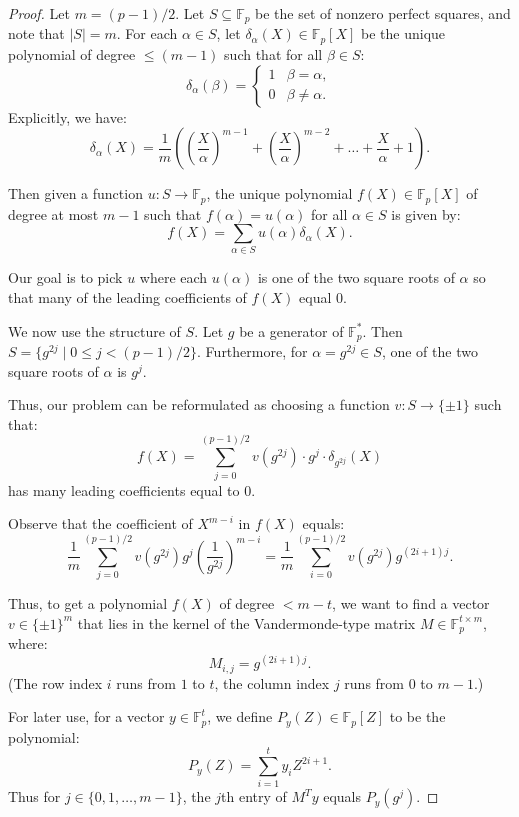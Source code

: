 \documentclass[10pt,a4paper]{article}
\newcommand{\F}{\mathbb{F}}
\begin{document}
\begin{proof}
Let $m = (p-1)/2$. Let $S \subseteq \F_p$ be the set of nonzero perfect squares,
and note that $|S| = m$.
For each $\alpha \in S$, let $\delta_\alpha(X) \in \F_p[X]$ be
the unique polynomial of degree $\leq (m-1)$ such that for all $\beta\in S$:
$$ \delta_\alpha(\beta) =  \begin{cases} 1  & \beta = \alpha, \\ 0 & \beta \neq \alpha. \end{cases}$$
Explicitly, we have:
$$\delta_\alpha(X) = \frac{1}{m} \left( \left(\frac{X}{\alpha}\right)^{m-1} + \left(\frac{X}{\alpha}\right)^{m-2} + \ldots + \frac{X}{\alpha} + 1 \right).$$


Then given a function $u: S \to \F_p$, 
the unique polynomial $f(X) \in \F_p[X]$ of degree at most $m-1$
such that $f(\alpha) = u(\alpha)$ for all $\alpha \in S$ is given by:
$$f(X) =  \sum_{\alpha \in S} u(\alpha) \delta_\alpha(X).$$

Our goal is to pick $u$ where each $u(\alpha)$ is one of the two square roots of $\alpha$ so that many of the leading coefficients of $f(X)$ equal $0$.

We now use the structure of $S$. Let $g$ be a generator of $\F_p^*$. 
Then $S = \{g^{2j} \mid  0 \leq j < (p-1)/2 \}$. Furthermore, 
for $\alpha = g^{2j} \in S$, one of the two square roots of $\alpha$
is $g^{j}$.

Thus, our problem can be reformulated as choosing a function
$v: S \to \{\pm 1 \}$ such that:
$$ f(X) = \sum_{j=0}^{(p-1)/2} v\left(g^{2j}\right)\cdot g^j \cdot \delta_{g^{2j}}(X)$$
has many leading coefficients equal to $0$.

Observe that the coefficient of $X^{m-i}$ in $f(X)$ equals:
$$ \frac{1}{m} \sum_{j=0}^{(p-1)/2} v(g^{2j}) g^{j} \left( \frac{1}{g^{2j}} \right)^{m-i} = 
 \frac{1}{m} \sum_{i=0}^{(p-1)/2} v(g^{2j}) g^{(2i+1)j}.$$


 Thus, to get a polynomial $f(X)$ of degree $< m-t$, we want to find a vector $v \in \{\pm 1\}^m$ that lies in the kernel of the Vandermonde-type matrix $M \in \F_p^{t \times m}$, where:
 $$ M_{i,j} = g^{(2i+1)j}.$$
 (The row index $i$ runs from $1$ to $t$, the column index $j$ runs from $0$ to $m-1$.)
 
 For later use, for a vector $y \in \F_p^t$, we define $P_y(Z) \in \F_p[Z]$ to be the polynomial:
 $$ P_y(Z) = \sum_{i = 1}^{t} y_i Z^{2i+1}.$$
 Thus for $j \in \{0, 1, \ldots, m-1 \}$, the $j$th entry of $M^Ty$ equals $P_y(g^{j})$.



\end{proof}
\end{document}
